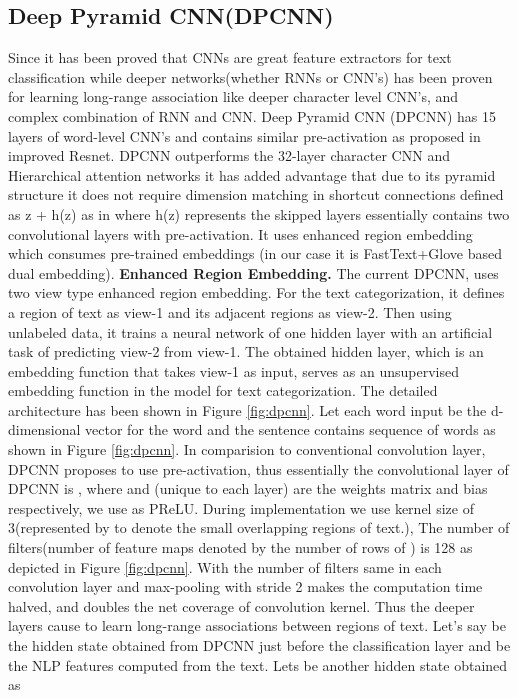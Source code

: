 \documentclass[sigconf]{acmart}
\begin{document}
\subsection{Deep Pyramid CNN(DPCNN)}\label{dpcnn}
Since it has been proved that CNNs are great feature extractors for text classification\cite{yin2017comparative, kim2014convolutional, johnson2014effective, johnson2015semi, johnson2016convolutional, johnson2017deep} while deeper networks(whether RNNs or CNN's) has been proven for learning long-range association like deeper character level CNN's\cite{zhang2015character, conneau2016very}, and complex combination of RNN and CNN\cite{peng2019hierarchical, shen2019towards, jiao2019higru, yu2018mattnet, yang2016hierarchical}. Deep Pyramid CNN (DPCNN)\cite{johnson2017deep} has 15 layers of word-level CNN's and contains similar pre-activation as proposed in improved Resnet\cite{he2016identity}. DPCNN outperforms the 32-layer character CNN\cite{conneau2016very} and Hierarchical attention networks\cite{yang2016hierarchical} it has added advantage that due to its pyramid structure it does not require dimension matching in shortcut connections defined as z +  h(z) as in\cite{he2016identity} where h(z) represents the skipped layers essentially contains two convolutional layers with pre-activation. It uses enhanced region embedding which consumes pre-trained embeddings (in our case it is FastText+Glove based dual embedding).
\newline \textbf{Enhanced Region Embedding.} The current DPCNN\cite{johnson2017deep}, uses two view type enhanced region embedding. For the text categorization, it defines a region of text as view-1 and its adjacent regions as view-2. Then using unlabeled data, it trains a neural network of one hidden layer with an artificial task of predicting view-2 from view-1. The obtained hidden layer, which is an embedding function that takes view-1 as input, serves as an unsupervised embedding function in the model for text categorization. The detailed architecture has been shown in Figure \ref{fig:dpcnn}. 
\newline Let each word input  be the d-dimensional vector for the  word  and the sentence  contains sequence of  words  as shown in Figure \ref{fig:dpcnn}.
In comparision to conventional convolution layer, DPCNN proposes to use pre-activation, thus essentially the convolutional layer of DPCNN is , where  and (unique to each layer) are the weights matrix and bias respectively, we use  as PReLU\cite{he2015delving}. During implementation we use kernel size of 3(represented by  to denote the small overlapping regions of text.), The number of filters(number of feature maps denoted by the number of rows of ) is 128 as depicted in Figure \ref{fig:dpcnn}. With the number of filters same in each convolution layer and max-pooling with stride 2 makes the computation time halved, and doubles the net coverage of convolution kernel. Thus the deeper layers cause to learn long-range associations between regions of text. Let's say  be the hidden state obtained from DPCNN just before the classification layer and   be the NLP features computed from the text. Lets  be another hidden state obtained as
\end{document}
